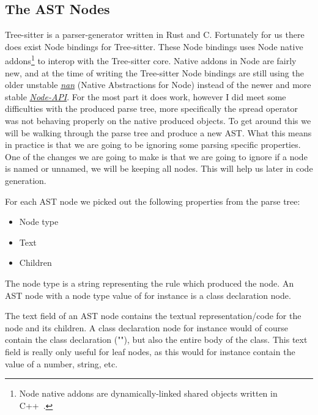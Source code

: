 
\subsection{The AST Nodes}\label{subsec:the-ast-nodes}

Tree-sitter is a parser-generator written in Rust and C\@.
Fortunately for us there does exist Node bindings for Tree-sitter.
These Node bindings uses Node native addons\footnote{Node native addons are dynamically-linked shared objects written in C++~\cite{nodenativeaddons}.} to interop with the Tree-sitter core.
Native addons in Node are fairly new, and at the time of writing the Tree-sitter Node bindings are still using the older unstable \textit{\hyperref[https://github.com/nodejs/nan]{nan}} (Native Abstractions for Node) instead of the newer and more stable \textit{\hyperref[https://nodejs.org/api/n-api.html]{Node-API}}.
For the most part it does work, however I did meet some difficulties with the produced parse tree, more specifically the spread operator was not behaving properly on the native produced objects.
To get around this we will be walking through the parse tree and produce a new AST\@.
What this means in practice is that we are going to be ignoring some parsing specific properties.
One of the changes we are going to make is that we are going to ignore if a node is named or unnamed, we will be keeping all nodes.
This will help us later in code generation.

For each AST node we picked out the following properties from the parse tree:

\begin{itemize}
    \item Node type
    \item Text
    \item Children
\end{itemize}

The node type is a string representing the rule which produced the node.
An AST node with a node type value of  for instance is a class declaration node.

The text field of an AST node contains the textual representation/code for the node and its children.
A class declaration node for instance would of course contain the class declaration (""), but also the entire body of the class.
This text field is really only useful for leaf nodes, as this would for instance contain the value of a number, string, etc.

